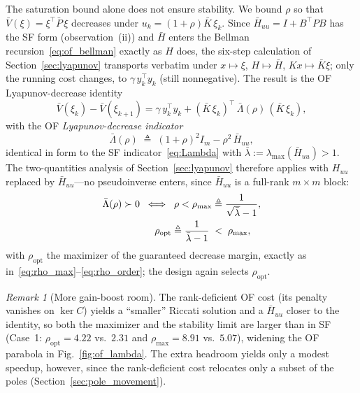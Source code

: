 \documentclass[final,5p,times,authoryear]{elsarticle}
\theoremstyle{plain}
\theoremstyle{definition}
\theoremstyle{remark}
\newtheorem{remark}{Remark}
\begin{document}
The saturation bound alone does not ensure stability.  We bound $\rho$
so that $\bar V(\xi) = \xi^{\!\top}\!\bar P\,\xi$ decreases under
$u_k = (1+\rho)\bar K\,\xi_k$.  Since $\bar H_{uu} = I + B^{\!\top}\!PB$
has the SF form (observation~(ii)) and $\bar H$ enters the Bellman
recursion~\eqref{eq:of_bellman} exactly as $H$ does, the six-step
calculation of Section~\ref{sec:lyapunov} transports verbatim under
$x \mapsto \xi$, $H \mapsto \bar H$, $Kx \mapsto \bar K\xi$; only the
running cost changes, to $\gamma\,y_k^{\!\top}\!y_k$ (still nonnegative).
The result is the OF Lyapunov-decrease identity
\begin{equation}
\bar V(\xi_k) - \bar V(\xi_{k+1})
  = \gamma\,y_k^{\!\top}\!y_k
  + (\bar K\,\xi_k)^{\!\top}\,\bar\Lambda(\rho)\,(\bar K\,\xi_k),
\label{eq:of_lyap_decrease}
\end{equation}
with the OF \emph{Lyapunov-decrease indicator}
\begin{equation}
\boxed{\bar\Lambda(\rho) \;\triangleq\;
       (1+\rho)^2 I_m - \rho^2\,\bar H_{uu},}
\label{eq:Lambda_bar}
\end{equation}
identical in form to the SF indicator~\eqref{eq:Lambda} with
$\bar\lambda := \lambda_{\max}(\bar H_{uu}) > 1$.  The two-quantities
analysis of Section~\ref{sec:lyapunov} therefore applies with $H_{uu}$
replaced by $\bar H_{uu}$---no pseudoinverse enters, since
$\bar H_{uu}$ is a full-rank $m \times m$ block:
\begin{align}
\bar\Lambda(\rho) \succ 0
   \;\iff\; \rho < \rho_{\max}
   &\triangleq \frac{1}{\sqrt{\bar\lambda} - 1},
   \notag\\
\rho_{\mathrm{opt}} \triangleq \frac{1}{\bar\lambda - 1}
   \;&<\; \rho_{\max},
\label{eq:of_rho_opt_derivation}
\end{align}
with $\rho_{\mathrm{opt}}$ the maximizer of the guaranteed decrease
margin, exactly as
in~\eqref{eq:rho_max}--\eqref{eq:rho_order}; the design again selects
$\rho_{\mathrm{opt}}$.

\begin{remark}[More gain-boost room]\label{rem:more_room}
The rank-deficient OF cost (its penalty vanishes on $\ker C$) yields
a ``smaller'' Riccati solution and a $\bar H_{uu}$ closer to the
identity, so both the
maximizer and the stability limit are larger than in SF (Case~1:
$\rho_{\mathrm{opt}} = 4.22$ vs.\ $2.31$ and $\rho_{\max} = 8.91$ vs.\
$5.07$), widening the OF parabola in Fig.~\ref{fig:of_lambda}.  The extra headroom
yields only a modest speedup, however, since the rank-deficient cost
relocates only a subset of the poles (Section~\ref{sec:pole_movement}).
\end{remark}
\end{document}
